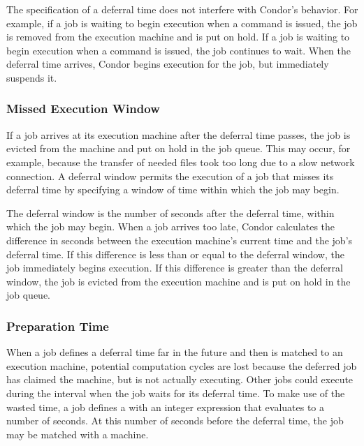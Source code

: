 The specification of a deferral time does not interfere
with Condor's behavior.
For example, if a job is waiting to begin execution
when a  command is issued,
the job is removed from the execution machine and is put on hold.
If a job is waiting to begin execution when 
a  command is issued,
the job continues to wait.
When the deferral time arrives,
Condor begins execution for the job,
but immediately suspends it.

\subsubsection{Missed Execution Window}
\label{sec:JobDeferral-DeferralWindow}

If a job arrives at its execution machine
after the deferral time passes,
the job is evicted from the machine and put on hold in the job queue.
This may occur, for example,
because the transfer of needed files took too long
due to a slow network connection.
A deferral window permits the execution of a job
that misses its deferral time by specifying a window of
time within which the job may begin.

The deferral window 
is the number of seconds after the deferral time,
within which the job may begin.
When a job arrives too late,
Condor calculates the difference in seconds
between the execution machine's current time
and the job's deferral time.
If this difference is less than or equal to the deferral window,
the job immediately begins execution.
If this difference is greater than the deferral window,
the job is evicted from the execution machine
and is put on hold in the job queue.

\subsubsection{Preparation Time}
\label{sec:JobDeferral-PrepTime}

When a job defines a deferral time far in the future and then 
is matched to an execution machine,
potential computation cycles are lost because the deferred job
has claimed the machine, but is not actually executing. 
Other jobs could execute during the interval when the job 
waits for its deferral time.
To make use of the wasted time,
a job defines a 
with an integer expression that evaluates to a
number of seconds.
At this number of seconds before the deferral time,
the job may be matched with a machine.

